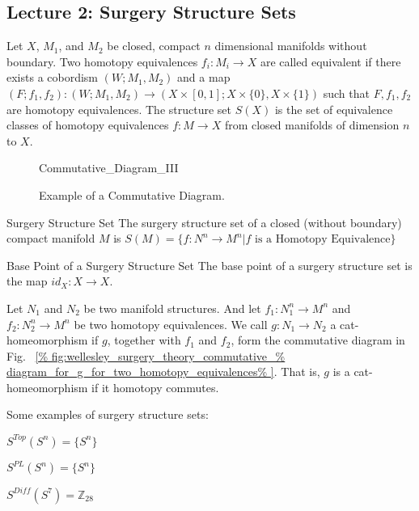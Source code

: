 \documentclass[crop=false,class=book,oneside]{standalone}
\begin{document}
    \subsection{Lecture 2: Surgery Structure Sets}
        Let $X$, $M_{1}$, and $M_{2}$ be closed,
        compact $n$ dimensional manifolds without boundary.
        Two homotopy equivalences $f_{i}:M_{i}\rightarrow X$
        are called equivalent if there exists a cobordism
        $(W;M_{1},M_{2})$ and a map
        $(F;f_{1},f_{2}):(W;M_{1},M_{2})%
         \rightarrow(X\times[0,1];X\times\{0\},X\times\{1\})$
        such that $F,f_{1},f_{2}$ are homotopy equivalences.
        The structure set $S(X)$ is the set of equivalence
        classes of homotopy equivalences $f:M\rightarrow X$
        from closed manifolds of dimension $n$ to $X$.
        \begin{figure}[H]
            \centering
            \captionsetup{type=figure}
            \resizebox{0.3\textwidth}{!}
                {{Commutative_Diagram_III}}
            \caption{Example of a Commutative Diagram.}
            \label{fig:wellesley_surgery_theory_commutative_%
                   diagram_for_g_for_two_homotopy_equivalences}
        \end{figure}
        \begin{ldefinition}{Surgery Structure Set}
            The surgery structure set of a closed
            (without boundary) compact manifold $M$ is
            $S(M)=\{f:N^{n}\rightarrow{M^{n}}|f%
             \textrm{ is a Homotopy Equivalence}\}$
        \end{ldefinition}
        \begin{ldefinition}{Base Point of a Surgery Structure Set}
            The base point of a surgery structure
            set is the map $id_{X}:X\rightarrow X$.
        \end{ldefinition}
        Let $N_{1}$ and $N_{2}$ be two manifold structures.
        And let $f_{1}:N_{1}^{n}\rightarrow M^{n}$ and
        $f_{2}:N_{2}^{n}\rightarrow M^{n}$ be two homotopy
        equivalences. We call $g:N_{1}\rightarrow N_{2}$ a
        cat-homeomorphism if $g$, together with $f_{1}$ and
        $f_{2}$, form the commutative diagram in Fig.~%
        \ref{%
            fig:wellesley_surgery_theory_commutative_%
            diagram_for_g_for_two_homotopy_equivalences%
        }.
        That is, $g$ is a cat-homeomorphism if it
        homotopy commutes.
        \begin{example}
            Some examples of surgery structure sets:
            \begin{enumerate}
                \begin{multicols}{3}
                    \item $S^{Top}(S^{n})=\{S^{n}\}$
                    \item $S^{PL}(S^{n})=\{S^{n}\}$
                    \item $S^{Diff}(S^{7})=\mathbb{Z}_{28}$
                \end{multicols}
            \end{enumerate}
        \end{example}
\end{document}
